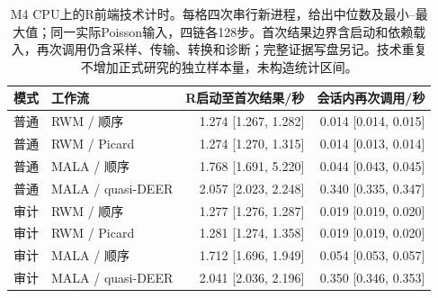 \begin{table}[htbp]\centering\small
\begin{tabular}{llrr}\toprule
模式 & 工作流 & R启动至首次结果/秒 & 会话内再次调用/秒\\\midrule
普通 & RWM / 顺序 & 1.274 [1.267, 1.282] & 0.014 [0.014, 0.015]\\
普通 & RWM / Picard & 1.274 [1.270, 1.315] & 0.014 [0.013, 0.014]\\
普通 & MALA / 顺序 & 1.768 [1.691, 5.220] & 0.044 [0.043, 0.045]\\
普通 & MALA / quasi-DEER & 2.057 [2.023, 2.248] & 0.340 [0.335, 0.347]\\
审计 & RWM / 顺序 & 1.277 [1.276, 1.287] & 0.019 [0.019, 0.020]\\
审计 & RWM / Picard & 1.281 [1.274, 1.358] & 0.019 [0.019, 0.020]\\
审计 & MALA / 顺序 & 1.712 [1.696, 1.949] & 0.054 [0.053, 0.057]\\
审计 & MALA / quasi-DEER & 2.041 [2.036, 2.196] & 0.350 [0.346, 0.353]\\
\bottomrule\end{tabular}
\caption{M4 CPU上的R前端技术计时。每格四次串行新进程，给出中位数及最小--最大值；同一实际Poisson输入，四链各128步。首次结果边界含启动和依赖载入，再次调用仍含采样、传输、转换和诊断；完整证据写盘另记。技术重复不增加正式研究的独立样本量，未构造统计区间。}
\label{tab:r-frontend}
\end{table}
